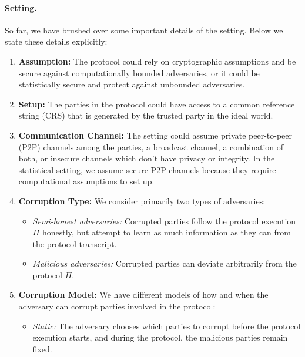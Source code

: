 \paragraph{Setting.} So far, we have brushed over some important details of the setting.
Below we state these details explicitly:
\begin{enumerate}
  \item \textbf{Assumption:} The protocol could rely on cryptographic assumptions and be secure against computationally bounded adversaries, or it could be statistically secure and protect against unbounded adversaries.
  \item \textbf{Setup:} The parties in the protocol could have access to a common reference string (CRS) that is generated by the trusted party in the ideal world.
  \item \textbf{Communication Channel:} 
  The setting could assume private peer-to-peer (P2P) channels among the parties, a broadcast channel, a combination of both, or insecure channels which don't have privacy or integrity. In the statistical setting, we assume secure P2P channels because they require computational assumptions to set up.
  \item \textbf{Corruption Type:} We consider primarily two types of adversaries:
    \begin{itemize}
      \item \emph{Semi-honest adversaries:} Corrupted parties follow the protocol
        execution $\Pi$ honestly, but attempt to learn as much information as they
        can from the protocol transcript.
      \item \emph{Malicious adversaries:} Corrupted parties can deviate arbitrarily
        from the protocol $\Pi$.
    \end{itemize}
  \item \textbf{Corruption Model:} We have different models of how and when the
    adversary can corrupt parties involved in the protocol:
    \begin{itemize}
      \item \emph{Static:} The adversary chooses which parties to corrupt before the protocol execution starts, and during the protocol, the malicious parties remain fixed.

\end{itemize}
\end{enumerate}
